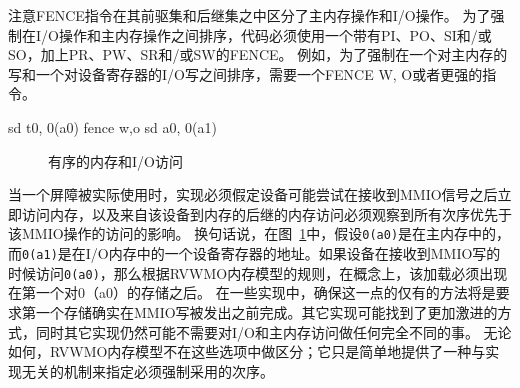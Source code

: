 注意FENCE指令在其前驱集和后继集之中区分了主内存操作和I/O操作。
为了强制在I/O操作和主内存操作之间排序，代码必须使用一个带有PI、PO、SI和/或SO，加上PR、PW、SR和/或SW的FENCE。
例如，为了强制在一个对主内存的写和一个对设备寄存器的I/O写之间排序，需要一个FENCE W, O或者更强的指令。

\begin{verbbox}
  sd t0, 0(a0)
  fence w,o
  sd a0, 0(a1)
\end{verbbox}
\begin{figure}[h!]
  \centering\small
  \theverbbox
  \caption{有序的内存和I/O访问}
  \label{fig:litmus:wo}
\end{figure}

当一个屏障被实际使用时，实现必须假定设备可能尝试在接收到MMIO信号之后立即访问内存，以及来自该设备到内存的后继的内存访问必须观察到所有次序优先于该MMIO操作的访问的影响。
换句话说，在图~\ref{fig:litmus:wo}中，假设{\tt 0(a0)}是在主内存中的，而{\tt 0(a1)}是在I/O内存中的一个设备寄存器的地址。如果设备在接收到MMIO写的时候访问{\tt 0(a0)}，那么根据RVWMO内存模型的规则，在概念上，该加载必须出现在第一个对0（a0）的存储之后。
在一些实现中，确保这一点的仅有的方法将是要求第一个存储确实在MMIO写被发出之前完成。其它实现可能找到了更加激进的方式，同时其它实现仍然可能不需要对I/O和主内存访问做任何完全不同的事。
无论如何，RVWMO内存模型不在这些选项中做区分；它只是简单地提供了一种与实现无关的机制来指定必须强制采用的次序。

